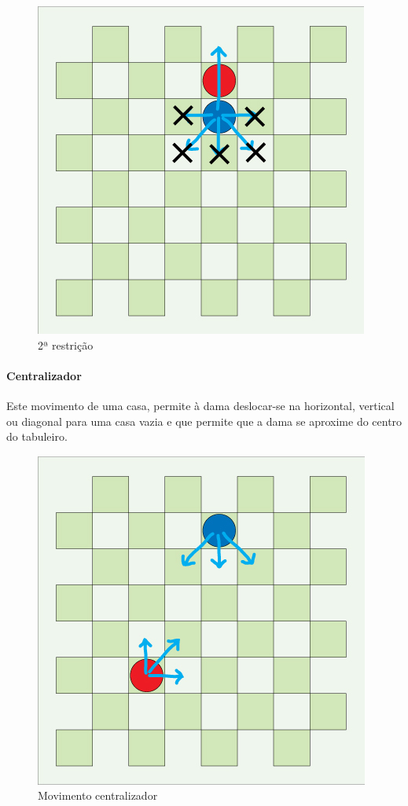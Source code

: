 \documentclass[a4paper,11pt]{article}
\begin{document}
\begin{figure}[H]
    \centering
    \includegraphics[scale=0.4]{res/2-restriction-2.jpg}
    \caption{2ª restrição}
    \label{fig:2-restriction-2.jpg}
\end{figure}

\paragraph{Centralizador}
Este movimento de uma casa, permite à dama deslocar-se na horizontal, vertical ou diagonal para uma casa vazia e que permite que a dama se aproxime do centro do tabuleiro.

\begin{figure}[H]
    \centering
    \includegraphics[scale=0.4]{res/3-centering.jpg}
    \caption{Movimento centralizador}
    \label{fig:3-centering.jpg}
\end{figure}
\end{document}
